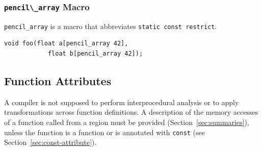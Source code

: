 %
%
%
%

\subsubsection{\lstinline!pencil\_array! Macro}

\lstinline!pencil_array! is a macro that abbreviates
  \lstinline!static const restrict!.

  \begin{lstlisting}[language=pencil]
void foo(float a[pencil_array 42],
            float b[pencil_array 42]);
  \end{lstlisting}

\subsection{Function Attributes}

A \pencil compiler is not supposed to perform interprocedural analysis or to
apply transformations across function definitions.
A description of the memory accesses of a function called from a \pencil
region must be provided (Section~\ref{sec:summaries}),
unless the function is a \pencil function
or is annotated with \lstinline!const! (see Section~\ref{sec:const-attribute}).

